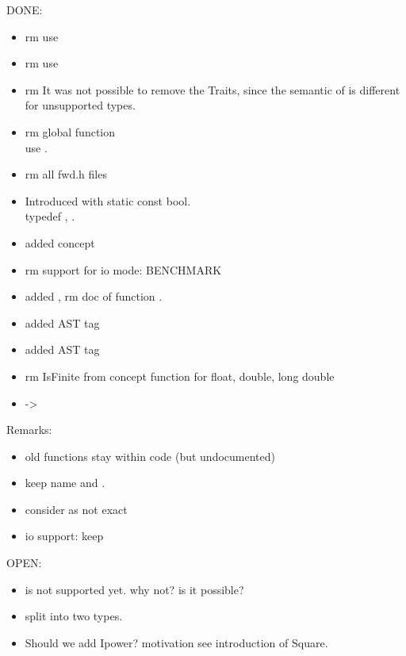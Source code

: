 DONE:

\begin{itemize}
\item rm  use 
\item rm  use 
\item rm  It was not possible to remove the Traits, since  
      the semantic of  is different for unsupported types.
\item rm global function \\
      use .
\item rm all fwd.h files    
\item Introduced  with static const bool. \\
      typedef , . 
\item added concept 
\item rm support for io mode: BENCHMARK 
\item added , rm doc of function .
\item added AST tag 
\item added AST tag 
\item rm IsFinite from  concept
      function  for float, double, long double 
\item {} -> 
\end{itemize}

Remarks:
\begin{itemize}
\item old functions stay within code (but undocumented)
\item keep name  and .
\item consider  as not exact
\item io support: keep  
\end{itemize}

OPEN:
\begin{itemize}
\item {} is not supported yet. why not? is it possible?  
\item split  into two types. 
\item Should we add Ipower? motivation see introduction of Square. 
\end{itemize}

